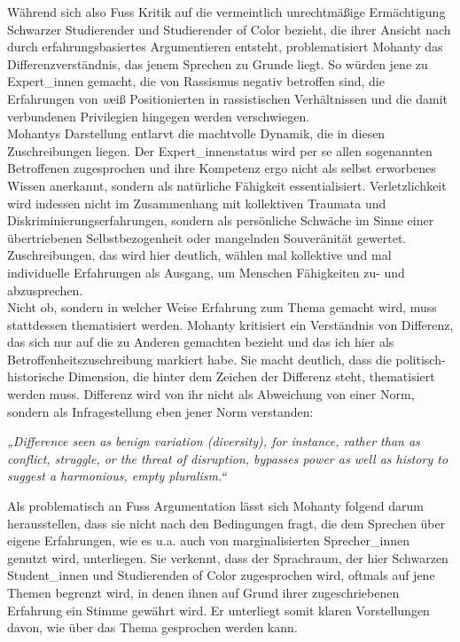 \noindent Während sich also Fuss Kritik auf die vermeintlich unrechtmäßige Ermächtigung
Schwarzer Studierender und Studierender of Color bezieht, die ihrer Ansicht
nach durch erfahrungsbasiertes Argumentieren entsteht, problematisiert Mohanty
das Differenzverständnis, das jenem Sprechen zu Grunde liegt. So würden jene zu
Expert\_innen gemacht, die von Rassismus negativ betroffen sind, die Erfahrungen
von \textit{w}eiß Positionierten in rassistischen Verhältnissen und die damit
verbundenen Privilegien hingegen werden verschwiegen.\\
Mohantys Darstellung
entlarvt die machtvolle Dynamik, die in diesen Zuschreibungen liegen. Der
Expert\_innenstatus wird per se allen sogenannten Betroffenen zugesprochen und
ihre Kompetenz ergo nicht als selbst erworbenes Wissen anerkannt, sondern als
natürliche Fähigkeit essentialisiert. Verletzlichkeit wird indessen nicht im
Zusammenhang mit kollektiven Traumata und Diskriminierungserfahrungen, sondern
als persönliche Schwäche im Sinne einer übertriebenen Selbstbezogenheit oder
mangelnden Souveränität gewertet. Zuschreibungen, das wird hier deutlich,
wählen mal kollektive und mal individuelle Erfahrungen als Ausgang, um Menschen
Fähigkeiten zu- und abzusprechen.\\
Nicht ob, sondern in welcher Weise Erfahrung zum Thema gemacht wird, muss
stattdessen thematisiert werden. Mohanty kritisiert ein Verständnis von
Differenz, das sich nur auf die zu Anderen gemachten bezieht und das ich hier
als Betroffenheitszuschreibung markiert habe. Sie macht deutlich, dass die
politisch-historische Dimension, die hinter dem Zeichen der Differenz steht,
thematisiert werden muss.  Differenz wird von ihr nicht als Abweichung von
einer Norm, sondern als Infragestellung eben jener Norm verstanden:
\begin{myenv}
  \textit{„Difference seen as benign variation (diversity), for instance,
  rather than as conflict, struggle, or the threat of disruption, bypasses
power as well as history to suggest a harmonious, empty
pluralism.“\footnotemark{}}
\end{myenv}
Als problematisch an Fuss Argumentation lässt sich Mohanty folgend darum
herausstellen, dass sie nicht nach den Bedingungen fragt, die dem Sprechen über
eigene Erfahrungen, wie es u.a. auch von marginalisierten Sprecher\_innen
genutzt wird, unterliegen. Sie verkennt, dass der Sprachraum, der hier
Schwarzen Student\_innen und Studierenden of Color zugesprochen wird, oftmals
auf jene Themen begrenzt wird, in denen ihnen auf Grund ihrer zugeschriebenen
Erfahrung ein Stimme gewährt wird. Er unterliegt somit klaren Vorstellungen
davon, wie über das Thema gesprochen werden kann.\\ 

